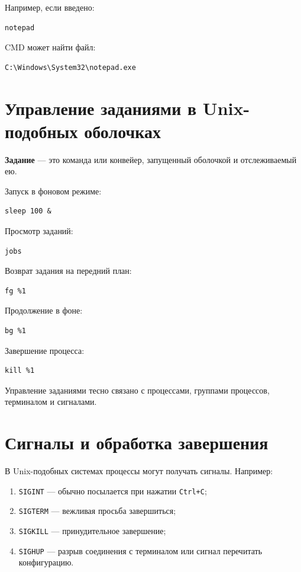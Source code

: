 \documentclass[12pt,a4paper]{article}
\begin{document}
Например, если введено:

\begin{lstlisting}
notepad
\end{lstlisting}

CMD может найти файл:

\begin{lstlisting}
C:\Windows\System32\notepad.exe
\end{lstlisting}

\section{Управление заданиями в Unix-подобных оболочках}

\textbf{Задание} --- это команда или конвейер, запущенный оболочкой и отслеживаемый ею.

Запуск в фоновом режиме:

\begin{lstlisting}
sleep 100 &
\end{lstlisting}

Просмотр заданий:

\begin{lstlisting}
jobs
\end{lstlisting}

Возврат задания на передний план:

\begin{lstlisting}
fg %1
\end{lstlisting}

Продолжение в фоне:

\begin{lstlisting}
bg %1
\end{lstlisting}

Завершение процесса:

\begin{lstlisting}
kill %1
\end{lstlisting}

Управление заданиями тесно связано с процессами, группами процессов, терминалом и сигналами.

\section{Сигналы и обработка завершения}

В Unix-подобных системах процессы могут получать сигналы. Например:
\begin{enumerate}
    \item \texttt{SIGINT} --- обычно посылается при нажатии \texttt{Ctrl+C};
    \item \texttt{SIGTERM} --- вежливая просьба завершиться;
    \item \texttt{SIGKILL} --- принудительное завершение;
    \item \texttt{SIGHUP} --- разрыв соединения с терминалом или сигнал перечитать конфигурацию.
\end{enumerate}
\end{document}
